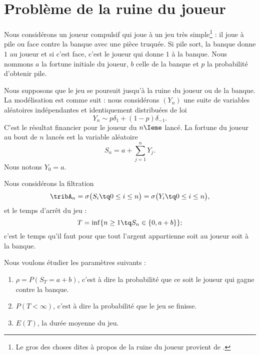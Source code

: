 \section{Problème de la ruine du joueur}

Nous considérons un joueur compulsif qui joue à un jeu très simple\footnote{Le gros des choses dites à propos de la ruine du joueur provient de \cite{KXjFWKA}.} : il joue à pile ou face contre la banque avec une pièce truquée. Si pile sort, la banque donne \( 1\) au joueur et si c'est face, c'est le joueur qui donne \( 1\) à la banque. Nous nommons \( a\) la fortune initiale du joueur,  \( b\) celle de la banque et \( p\) la probabilité d'obtenir pile.

Nous supposons que le jeu se poursuit jusqu'à la ruine du joueur ou de la banque. La modélisation est comme suit : nous considérons \( (Y_n)\) une suite de variables aléatoires indépendantes et identiquement distribuées de loi
\begin{equation}
    Y_n\sim p\delta_1+(1-p)\delta_{-1}.
\end{equation}
C'est le résultat financier pour le joueur du \( n\Ieme\) lancé. La fortune du joueur au bout de \( n\) lancés est la variable aléatoire
\begin{equation}
    S_n=a+\sum_{j=1}^nY_j.
\end{equation}
Nous notons \( Y_0=a\).

Nous considérons la filtration
\begin{equation}
    \tribA_n=\sigma\big( S_i\tq 0\leq i\leq n \big)=\sigma\big( Y_i\tq 0\leq i\leq n \big),
\end{equation}
et le temps d'arrêt du jeu :
\begin{equation}
    T=\inf\{ n\geq 1\tq S_n\in\{ 0,a+b \} \};
\end{equation}
c'est le temps qu'il faut pour que tout l'argent appartienne soit au joueur soit à la banque.

Nous voulons étudier les paramètres suivants :
\begin{enumerate}
    \item
        \( \rho=P(S_T=a+b)\), c'est à dire la probabilité que ce soit le joueur qui gagne contre la banque.
    \item
        \( P(T<\infty)\), c'est à dire la probabilité que le jeu se finisse.
    \item
        \( E(T)\), la durée moyenne du jeu.
\end{enumerate}

